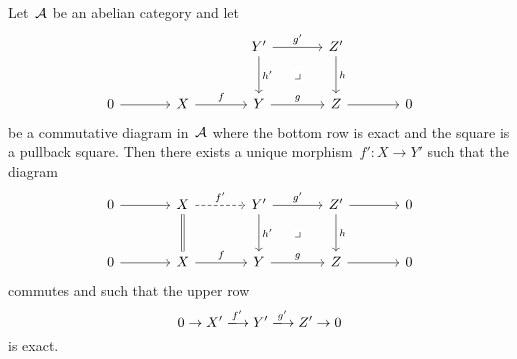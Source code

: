 \begin{proposition}
  \label{kernels of pullbacks}
  Let~$\mathcal{A}$ be an abelian category and let
  \[
    \begin{tikzcd}[sep = large]
        {}
      & {}
      & Y'
        \arrow{r}[above]{g'}
        \arrow{d}[right]{h'}
        \arrow[phantom]{dr}[description]{\pb}
      & Z'
        \arrow{d}[right]{h}
      & {}
      \\
        0
        \arrow{r}
      & X
        \arrow{r}[above]{f}
      & Y
        \arrow{r}[above]{g}
      & Z
        \arrow{r}
      & 0
    \end{tikzcd}
  \]
  be a commutative diagram in~$\mathcal{A}$ where the bottom row is exact and the square is a pullback square.
  Then there exists a unique morphism~$f' \colon X \to Y'$ such that the diagram
  \begin{equation}
    \label{resulting pb of ses}
    \begin{tikzcd}[sep = large]
        0
        \arrow{r}
      & X
        \arrow[dashed]{r}[above]{f'}
        \arrow[equal]{d}
      & Y'
        \arrow{r}[above]{g'}
        \arrow{d}[right]{h'}
        \arrow[phantom]{dr}[description]{\pb}
      & Z'
        \arrow{d}[right]{h}
        \arrow{r}
      & 0
      \\
        0
        \arrow{r}
      & X
        \arrow{r}[above]{f}
      & Y
        \arrow{r}[above]{g}
      & Z
        \arrow{r}
      & 0
    \end{tikzcd}
  \end{equation}
  commutes and such that the upper row
  \begin{equation}
    \label{upper row}
    0
    \to
    X'
    \xlongto{f'}
    Y'
    \xlongto{g'}
    Z'
    \to
    0
  \end{equation}
  is exact.
\end{proposition}


